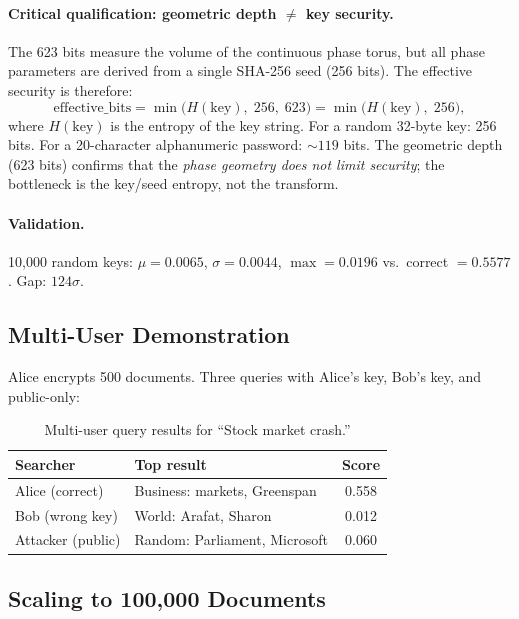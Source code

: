 \documentclass{article}
\begin{document}
\paragraph{Critical qualification: geometric depth $\neq$ key security.}
The 623 bits measure the volume of the continuous phase torus, but all phase parameters are derived from a single SHA-256 seed (256 bits).
The effective security is therefore:
\[
  \mathrm{effective\_bits} = \min\bigl(H(\mathrm{key}),\; 256,\; 623\bigr) = \min\bigl(H(\mathrm{key}),\; 256\bigr),
\]
where $H(\mathrm{key})$ is the entropy of the key string.
For a random 32-byte key: 256 bits.
For a 20-character alphanumeric password: ${\sim}119$ bits.
The geometric depth (623 bits) confirms that the \emph{phase geometry does not limit security}; the bottleneck is the key/seed entropy, not the transform.

\paragraph{Validation.}
10{,}000 random keys: $\mu{=}0.0065$, $\sigma{=}0.0044$, $\max{=}0.0196$ vs.\ correct $= 0.5577$.
Gap: $124\sigma$.

\subsection{Multi-User Demonstration}

Alice encrypts 500 documents. Three queries with Alice's key, Bob's key, and public-only:

\begin{table}[htbp]
\centering
\caption{Multi-user query results for ``Stock market crash.''}
\label{tab:multiuser}
\begin{tabular}{@{}llc@{}}
\toprule
\textbf{Searcher} & \textbf{Top result} & \textbf{Score} \\
\midrule
Alice (correct) & Business: markets, Greenspan & 0.558 \\
Bob (wrong key) & World: Arafat, Sharon & 0.012 \\
Attacker (public) & Random: Parliament, Microsoft & 0.060 \\
\bottomrule
\end{tabular}
\end{table}

\subsection{Scaling to 100{,}000 Documents}
\end{document}
